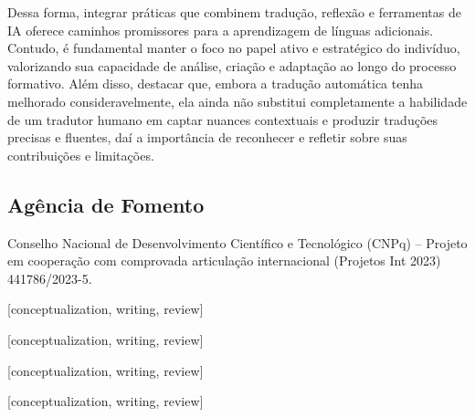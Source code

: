 \documentclass[portuguese]{textolivre}
\begin{document}
Dessa forma, integrar práticas que combinem tradução, reflexão e ferramentas de IA oferece caminhos promissores para a aprendizagem de línguas adicionais. Contudo, é fundamental manter o foco no papel ativo e estratégico do indivíduo, valorizando sua capacidade de análise, criação e adaptação ao longo do processo formativo. Além disso, destacar que, embora a tradução automática tenha melhorado consideravelmente, ela ainda não substitui completamente a habilidade de um tradutor humano em captar nuances contextuais e produzir traduções precisas e fluentes, daí a importância de reconhecer e refletir sobre suas contribuições e limitações.

\printbibliography\label{sec-bib}

\subsection*{Agência de Fomento}
Conselho Nacional de Desenvolvimento Científico e Tecnológico (CNPq) -- Projeto em cooperação com comprovada articulação internacional (Projetos Int 2023) 441786/2023-5.

\begin{contributors}
[conceptualization, writing, review]

[conceptualization, writing, review]

[conceptualization, writing, review]

[conceptualization, writing, review]
\end{contributors}
\end{document}
